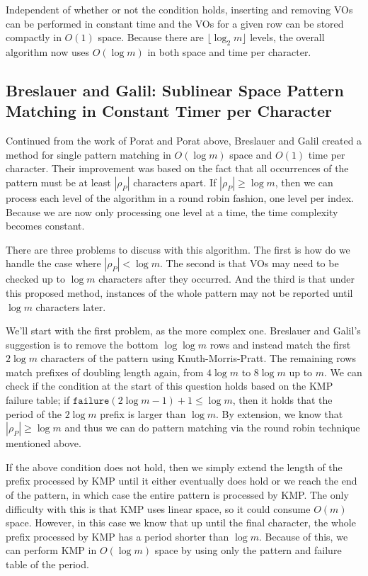 \documentclass[ %
                    author={Dominic Joseph Moylett},
                    degree={MEng},
                     title={Dictionary Matching with Fingerprints},
                  subtitle={An Empirical Analysis},
                      type={Research},
                      year={2014} ]{dissertation}
\begin{document}
Independent of whether or not the condition holds, inserting and removing VOs can be performed in constant time and the VOs for a given row can be stored compactly in $O(1)$ space. Because there are $\lfloor\log_2m\rfloor$ levels, the overall algorithm now uses $O(\log m)$ in both space and time per character.

\subsection{Breslauer and Galil: Sublinear Space Pattern Matching in Constant Timer per Character}
\label{ssec:breslauer-galil}

Continued from the work of Porat and Porat above, Breslauer and Galil\cite{Breslauer:2014:RSS:2660854.2635814} created a method for single pattern matching in $O(\log m)$ space and $O(1)$ time per character. Their improvement was based on the fact that all occurrences of the pattern must be at least $|\rho_P|$ characters apart. If $|\rho_P| \geq \log m$, then we can process each level of the algorithm in a round robin fashion, one level per index. Because we are now only processing one level at a time, the time complexity becomes constant.

There are three problems to discuss with this algorithm. The first is how do we handle the case where $|\rho_P| < \log m$. The second is that VOs may need to be checked up to $\log m$ characters after they occurred. And the third is that under this proposed method, instances of the whole pattern may not be reported until $\log m$ characters later.

We'll start with the first problem, as the more complex one. Breslauer and Galil's suggestion is to remove the bottom $\log\log m$ rows and instead match the first $2\log m$ characters of the pattern using Knuth-Morris-Pratt\cite{kmp}. The remaining rows match prefixes of doubling length again, from $4\log m$ to $8\log m$ up to $m$. We can check if the condition at the start of this question holds based on the KMP failure table; if $\texttt{failure}(2\log m - 1) + 1 \leq \log m$, then it holds that the period of the $2\log m$ prefix is larger than $\log m$. By extension, we know that $|\rho_P| \geq \log m$ and thus we can do pattern matching via the round robin technique mentioned above.

If the above condition does not hold, then we simply extend the length of the prefix processed by KMP until it either eventually does hold or we reach the end of the pattern, in which case the entire pattern is processed by KMP. The only difficulty with this is that KMP uses linear space, so it could consume $O(m)$ space. However, in this case we know that up until the final character, the whole prefix processed by KMP has a period shorter than $\log m$. Because of this, we can perform KMP in $O(\log m)$ space by using only the pattern and failure table of the period.
\end{document}
